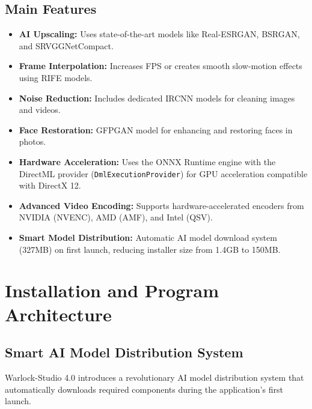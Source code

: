\documentclass[11pt, a4paper]{article}
\begin{document}
\subsection{Main Features}
\begin{itemize}[leftmargin=*]
    \item \textbf{AI Upscaling:} Uses state-of-the-art models like Real-ESRGAN, BSRGAN, and SRVGGNetCompact.
    \item \textbf{Frame Interpolation:} Increases FPS or creates smooth slow-motion effects using RIFE models.
    \item \textbf{Noise Reduction:} Includes dedicated IRCNN models for cleaning images and videos.
    \item \textbf{Face Restoration:} GFPGAN model for enhancing and restoring faces in photos.
    \item \textbf{Hardware Acceleration:} Uses the ONNX Runtime engine with the DirectML provider (\texttt{DmlExecutionProvider}) for GPU acceleration compatible with DirectX 12.
    \item \textbf{Advanced Video Encoding:} Supports hardware-accelerated encoders from NVIDIA (NVENC), AMD (AMF), and Intel (QSV).
    \item \textbf{Smart Model Distribution:} Automatic AI model download system (327MB) on first launch, reducing installer size from 1.4GB to 150MB.
\end{itemize}


\section{Installation and Program Architecture}

\subsection{Smart AI Model Distribution System}
\begin{infobox}
Warlock-Studio 4.0 introduces a revolutionary AI model distribution system that automatically downloads required components during the application's first launch.
\end{infobox}
\end{document}
